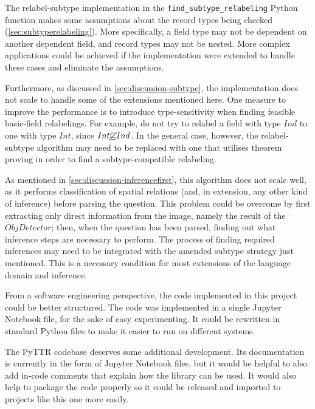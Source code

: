 The relabel-subtype implementation in the \texttt{find\_subtype\_relabeling} Python function makes some assumptions about the record types being checked (\autoref{sec:subtyperelabeling}).
More specifically, a field type may not be dependent on another dependent field, and record types may not be nested.
More complex applications could be achieved if the implementation were extended to handle these cases and eliminate the assumptions.

Furthermore, as discussed in \autoref{sec:discussion-subtype}, the implementation does not scale to handle some of the extensions mentioned here.
One measure to improve the performance is to introduce type-sensitivity when finding feasible basic-field relabelings.
For example, do not try to relabel a field with type $Ind$ to one with type $Int$, since $Int \cancel\sqsubseteq Ind$.
In the general case, however, the relabel-subtype algorithm may need to be replaced with one that utilises theorem proving in order to find a subtype-compatible relabeling.

As mentioned in \autoref{sec:discussion-inferencefirst}, this algorithm does not scale well, as it performs classification of spatial relations (and, in extension, any other kind of inference) before parsing the question.
This problem could be overcome by first extracting only direct information from the image, namely the result of the $ObjDetector$;
then, when the question has been parsed, finding out what inference steps are necessary to perform.
The process of finding required inferences may need to be integrated with the amended subtype strategy just mentioned.
This is a necessary condition for most extensions of the language domain and inference.

From a software engineering perspective, the code implemented in this project could be better structured.
The code was implemented in a single Jupyter Notebook file, for the sake of easy experimenting.
It could be rewritten in standard Python files to make it easier to run on different systems.

The PyTTR codebase deserves some additional development.
Its documentation is currently in the form of Jupyter Notebook files, but it would be helpful to also add in-code comments that explain how the library can be used.
It would also help to package the code properly so it could be released and imported to projects like this one more easily.


